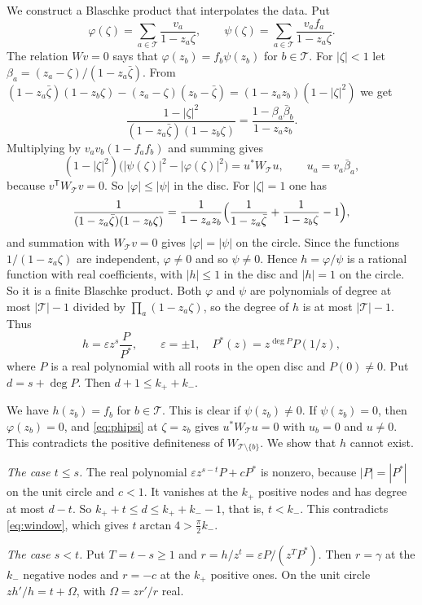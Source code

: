 We construct a Blaschke product that interpolates the data. Put
\[
 \varphi(\zeta)=\sum_{a\in\mathcal T}\frac{v_a}{1-z_a\zeta},\qquad \psi(\zeta)=\sum_{a\in\mathcal T}\frac{v_af_a}{1-z_a\zeta}.
\]
The relation $Wv=0$ says that $\varphi(z_b)=f_b\psi(z_b)$ for $b\in\mathcal T$. For $|\zeta|<1$ let $\beta_a=(z_a-\zeta)/(1-z_a\bar\zeta)$. From
$(1-z_a\bar\zeta)(1-z_b\zeta)-(z_a-\zeta)(z_b-\bar\zeta)=(1-z_az_b)(1-|\zeta|^2)$ we get
\[
 \frac{1-|\zeta|^2}{(1-z_a\bar\zeta)(1-z_b\zeta)}=\frac{1-\beta_a\bar\beta_b}{1-z_az_b}.
\]
Multiplying by $v_av_b(1-f_af_b)$ and summing gives
\begin{equation}\label{eq:phipsi}
 (1-|\zeta|^2)\bigl(|\psi(\zeta)|^2-|\varphi(\zeta)|^2\bigr)=u^*W_{\mathcal T}u,\qquad u_a=v_a\bar\beta_a,
\end{equation}
because $v^{\mathsf T}W_{\mathcal T}v=0$. So $|\varphi|\le|\psi|$ in the disc. For $|\zeta|=1$ one has
\[
 \frac1{(1-z_a\bar\zeta)(1-z_b\zeta)}=\frac1{1-z_az_b}\Bigl(\frac1{1-z_a\bar\zeta}+\frac1{1-z_b\zeta}-1\Bigr),
\]
and summation with $W_{\mathcal T}v=0$ gives $|\varphi|=|\psi|$ on the circle. Since the functions $1/(1-z_a\zeta)$ are independent, $\varphi\ne0$ and so $\psi\ne0$.
Hence $h=\varphi/\psi$ is a rational function with real coefficients, with $|h|\le1$ in the disc and $|h|=1$ on the circle. So it is a finite
Blaschke product. Both $\varphi$ and $\psi$ are polynomials of degree at most $|\mathcal T|-1$ divided by $\prod_a(1-z_a\zeta)$, so the degree of $h$ is at most
$|\mathcal T|-1$. Thus
\[
 h=\varepsilon z^s\frac{P}{P^*},\qquad \varepsilon=\pm1,\quad P^*(z)=z^{\deg P}P(1/z),
\]
where $P$ is a real polynomial with all roots in the open disc and $P(0)\ne0$. Put $d=s+\deg P$. Then $d+1\le k_++k_-$.

We have $h(z_b)=f_b$ for $b\in\mathcal T$. This is clear if $\psi(z_b)\ne0$. If $\psi(z_b)=0$, then $\varphi(z_b)=0$, and \eqref{eq:phipsi} at $\zeta=z_b$ gives $u^*W_{\mathcal T}u=0$
with $u_b=0$ and $u\ne0$. This contradicts the positive definiteness of $W_{\mathcal T\setminus\{b\}}$. We show that $h$ cannot exist.

\emph{The case $t\le s$.} The real polynomial $\varepsilon z^{s-t}P+cP^*$ is nonzero, because $|P|=|P^*|$ on the
unit circle and $c<1$. It vanishes at the $k_+$ positive nodes and has degree at most $d-t$. So $k_++t\le d\le
k_++k_--1$, that is, $t<k_-$. This contradicts \eqref{eq:window}, which gives $t\arctan4>\frac\pi2k_-$.

\emph{The case $s<t$.} Put $T=t-s\ge1$ and $r=h/z^t=\varepsilon P/(z^TP^*)$. Then $r=\gamma$ at the $k_-$ negative
nodes and $r=-c$ at the $k_+$ positive ones. On the unit circle $zh'/h=t+\Omega$, with $\Omega=zr'/r$ real.


